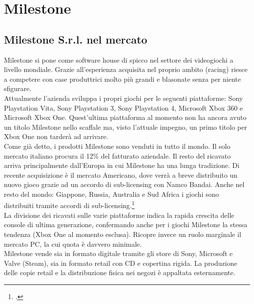 
\chapter{Milestone}
\label{cap:milestone}

\section{Milestone S.r.l. nel mercato}

Milestone si pone come software house di spicco nel settore dei videogiochi a livello mondiale. Grazie all'esperienza acquisita nel proprio ambito (racing) riesce a competere con case produttrici molto più grandi e blasonate senza per niente sfigurare.\\

Attualmente l'azienda sviluppa i propri giochi per le seguenti piattaforme: Sony Playstation Vita, Sony Playstation 3, Sony Playstation 4, Microsoft Xbox 360 e Microsoft Xbox One. Quest'ultima piattaforma al momento non ha ancora avuto un titolo Milestone nello scaffale ma, visto l'attuale impegno, un primo titolo per Xbox One non tarderà ad arrivare.\\

Come già detto, i prodotti Milestone sono venduti in tutto il mondo. Il solo mercato italiano procura il 12\% del fatturato aziendale. Il resto del ricavato arriva principalmente dall'Europa in cui Milestone ha una lunga tradizione. Di recente acquisizione è il mercato Americano, dove verrà a breve distribuito un nuovo gioco grazie ad un accordo di sub-licensing con Namco Bandai. Anche nel resto del mondo: Giappone, Russia, Australia e Sud Africa i giochi sono distribuiti tramite accordi di sub-licensing.\footcite{site:accordo-namc-bandai}\\

La divisione dei ricavati sulle varie piattaforme indica la rapida crescita delle console di ultima generazione, confermando anche per i giochi Milestone la stessa tendenza (Xbox One al momento esclusa). Ricopre invece un ruolo marginale il mercato PC, la cui quota è davvero minimale.\\

Milestone vende sia in formato digitale tramite gli store di Sony, Microsoft e Valve (Steam), sia in formato retail con CD e copertina rigida. La produzione delle copie retail e la distribuzione fisica nei negozi è appaltata esternamente.\\

